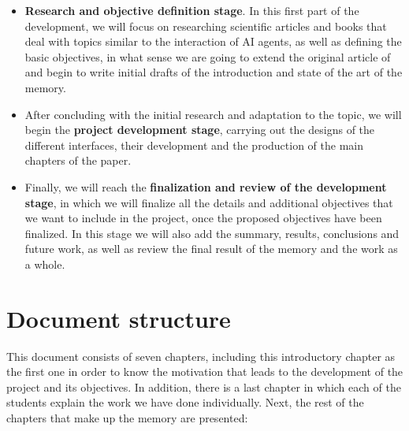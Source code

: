\begin{itemize}
	
	\item \textbf{Research and objective definition stage}. In this first part of the development, we will focus on researching scientific articles and books that deal with topics similar to the interaction of AI agents, as well as defining the basic objectives, in what sense we are going to extend the original article of \ga and begin to write initial drafts of the introduction and state of the art of the memory.
	
	\item After concluding with the initial research and adaptation to the topic, we will begin the \textbf{project development stage}, carrying out the designs of the different interfaces, their development and the production of the main chapters of the paper.
	
	\item Finally, we will reach the \textbf{finalization and review of the development stage}, in which we will finalize all the details and additional objectives that we want to include in the project, once the proposed objectives have been finalized. In this stage we will also add the summary, results, conclusions and future work, as well as review the final result of the memory and the work as a whole.
\end{itemize}

\section{Document structure}

This document consists of seven chapters, including this introductory chapter as the first one in order to know the motivation that leads to the development of the project and its objectives. In addition, there is a last chapter in which each of the students explain the work we have done individually. Next, the rest of the chapters that make up the memory are presented:

